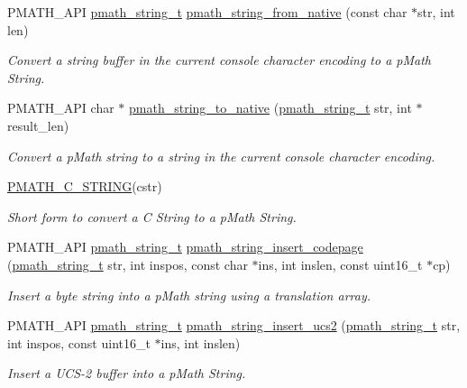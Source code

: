 \begin{CompactItemize}
PMATH\_\-API \hyperlink{classpmath__string__t}{pmath\_\-string\_\-t} \hyperlink{group__strings_g37cf187968e366edd0998dda0bd5ea7a}{pmath\_\-string\_\-from\_\-native} (const char $\ast$str, int len)
\begin{CompactList}\small\item\em Convert a string buffer in the current console character encoding to a pMath String. \item\end{CompactList}\item 
PMATH\_\-API char $\ast$ \hyperlink{group__strings_g7ccade7efa65dc24f7cd573f15fc07e9}{pmath\_\-string\_\-to\_\-native} (\hyperlink{classpmath__string__t}{pmath\_\-string\_\-t} str, int $\ast$result\_\-len)
\begin{CompactList}\small\item\em Convert a pMath string to a string in the current console character encoding. \item\end{CompactList}\item 
\hyperlink{group__strings_g63b8849d6cfcfa9d73bd404d7a4071c0}{PMATH\_\-C\_\-STRING}(cstr)
\begin{CompactList}\small\item\em Short form to convert a C String to a pMath String. \item\end{CompactList}\item 
PMATH\_\-API \hyperlink{classpmath__string__t}{pmath\_\-string\_\-t} \hyperlink{group__strings_g5008b0b2e682b283772e10bf38666ffe}{pmath\_\-string\_\-insert\_\-codepage} (\hyperlink{classpmath__string__t}{pmath\_\-string\_\-t} str, int inspos, const char $\ast$ins, int inslen, const uint16\_\-t $\ast$cp)
\begin{CompactList}\small\item\em Insert a byte string into a pMath string using a translation array. \item\end{CompactList}\item 
PMATH\_\-API \hyperlink{classpmath__string__t}{pmath\_\-string\_\-t} \hyperlink{group__strings_ge49ea36d0f35856b6b9aeb0c4470c614}{pmath\_\-string\_\-insert\_\-ucs2} (\hyperlink{classpmath__string__t}{pmath\_\-string\_\-t} str, int inspos, const uint16\_\-t $\ast$ins, int inslen)
\begin{CompactList}\small\item\em Insert a UCS-2 buffer into a pMath String. \item\end{CompactList}\item 

\end{CompactItemize}
